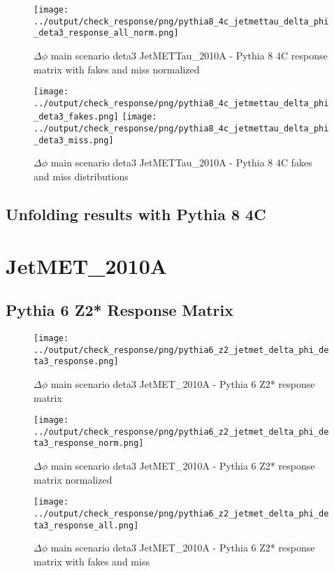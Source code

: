 \documentclass[11pt]{book}
\begin{document}
\begin{figure}[ht]
\centering
\texttt{[image: ../output/check\_response/png/pythia8\_4c\_jetmettau\_delta\_phi\_deta3\_response\_all\_norm.png]}
\caption{$\Delta\phi$ main scenario deta3 JetMETTau\_2010A - Pythia 8 4C response matrix with fakes and miss normalized}
\label{p8_jetmettau_delta_phi_deta3_response_all_norm}
\end{figure}

\begin{figure}[ht]
\centering
\texttt{[image: ../output/check\_response/png/pythia8\_4c\_jetmettau\_delta\_phi\_deta3\_fakes.png]}
\texttt{[image: ../output/check\_response/png/pythia8\_4c\_jetmettau\_delta\_phi\_deta3\_miss.png]}
\caption{$\Delta\phi$ main scenario deta3 JetMETTau\_2010A - Pythia 8 4C fakes and miss distributions}
\label{p8_jetmettau_delta_phi_deta3_fakesmiss}
\end{figure}


\clearpage
\subsection{Unfolding results with Pythia 8 4C}


\section{JetMET\_2010A}
\subsection{Pythia 6 Z2* Response Matrix}

\begin{figure}[ht]
\centering
\texttt{[image: ../output/check\_response/png/pythia6\_z2\_jetmet\_delta\_phi\_deta3\_response.png]}
\caption{$\Delta\phi$ main scenario deta3 JetMET\_2010A - Pythia 6 Z2* response matrix}
\label{p6_jetmet_delta_phi_deta3_response}
\end{figure}

\begin{figure}[ht]
\centering
\texttt{[image: ../output/check\_response/png/pythia6\_z2\_jetmet\_delta\_phi\_deta3\_response\_norm.png]}
\caption{$\Delta\phi$ main scenario deta3 JetMET\_2010A - Pythia 6 Z2* response matrix normalized}
\label{p6_jetmet_delta_phi_deta3_response_norm}
\end{figure}

\begin{figure}[ht]
\centering
\texttt{[image: ../output/check\_response/png/pythia6\_z2\_jetmet\_delta\_phi\_deta3\_response\_all.png]}
\caption{$\Delta\phi$ main scenario deta3 JetMET\_2010A - Pythia 6 Z2* response matrix with fakes and miss}
\label{p6_jetmet_delta_phi_deta3_response_all}
\end{figure}
\end{document}
